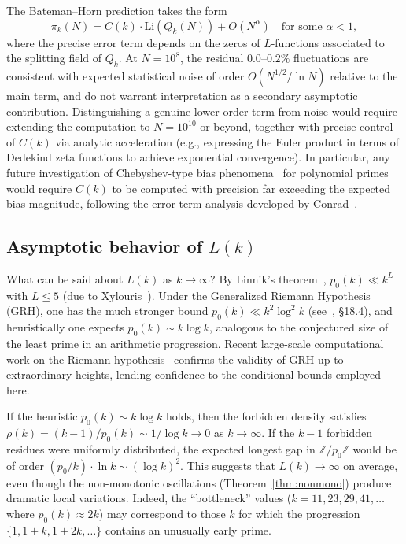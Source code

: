 \documentclass[11pt,a4paper]{article}
\newcommand{\Qk}{Q_k}
\newcommand{\ZZ}{\mathbb{Z}}
\begin{document}
The Bateman--Horn prediction takes the form
\[
  \pi_k(N) = C(k) \cdot \mathrm{Li}(\Qk(N)) + O(N^\alpha) \quad \text{for some } \alpha < 1,
\]
where the precise error term depends on the zeros of $L$-functions associated to the splitting field of $\Qk$. At $N = 10^8$, the residual $0.0$--$0.2\%$ fluctuations are consistent with expected statistical noise of order $O(N^{1/2}/\ln N)$ relative to the main term, and do not warrant interpretation as a secondary asymptotic contribution. Distinguishing a genuine lower-order term from noise would require extending the computation to $N = 10^{10}$ or beyond, together with precise control of $C(k)$ via analytic acceleration (e.g., expressing the Euler product in terms of Dedekind zeta functions to achieve exponential convergence). In particular, any future investigation of Chebyshev-type bias phenomena~\cite{granvillemartin, rubinsteinsarnak} for polynomial primes would require $C(k)$ to be computed with precision far exceeding the expected bias magnitude, following the error-term analysis developed by Conrad~\cite{conrad}.

\subsection{Asymptotic behavior of $L(k)$}

What can be said about $L(k)$ as $k \to \infty$? By Linnik's theorem~\cite{linnik}, $p_0(k) \ll k^L$ with $L \le 5$ (due to Xylouris~\cite{xylouris}). Under the Generalized Riemann Hypothesis (GRH), one has the much stronger bound $p_0(k) \ll k^2 \log^2 k$ (see~\cite{iwaniec}, \S18.4), and heuristically one expects $p_0(k) \sim k \log k$, analogous to the conjectured size of the least prime in an arithmetic progression. Recent large-scale computational work on the Riemann hypothesis~\cite{platt} confirms the validity of GRH up to extraordinary heights, lending confidence to the conditional bounds employed here.

If the heuristic $p_0(k) \sim k \log k$ holds, then the forbidden density satisfies $\rho(k) = (k-1)/p_0(k) \sim 1/\log k \to 0$ as $k \to \infty$. If the $k-1$ forbidden residues were uniformly distributed, the expected longest gap in $\ZZ/p_0\ZZ$ would be of order $(p_0/k) \cdot \ln k \sim (\log k)^2$. This suggests that $L(k) \to \infty$ on average, even though the non-monotonic oscillations (Theorem~\ref{thm:nonmono}) produce dramatic local variations. Indeed, the ``bottleneck'' values ($k = 11, 23, 29, 41, \ldots$ where $p_0(k) \approx 2k$) may correspond to those $k$ for which the progression $\{1, 1+k, 1+2k, \ldots\}$ contains an unusually early prime.
\end{document}
